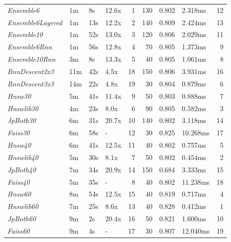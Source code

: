 \begin{tabular}{llllrrrlr}
\toprule
\midrule
\emph{Ensemble6} & 1m & 8s & 12.6x & 1 & 130 & 0.802 & 2.318ms & 12 \\
\emph{Ensemble6Layered} & 1m & 13s & 12.2x & 2 & 140 & 0.809 & 2.424ms & 13 \\
\emph{Ensemble10} & 1m & 52s & 13.0x & 3 & 120 & 0.806 & 2.029ms & 11 \\
\emph{Ensemble6Rnn} & 1m & 56s & 12.8x & 4 & 70 & 0.805 & 1.373ms & 9 \\
\emph{Ensemble10Rnn} & 3m & 8s & 13.3x & 5 & 40 & 0.805 & 1.061ms & 8 \\
\emph{RnnDescent2x3} & 11m & 42s & 4.5x & 18 & 150 & 0.806 & 3.931ms & 16 \\
\emph{RnnDescent3x3} & 14m & 22s & 4.8x & 19 & 30 & 0.804 & 0.879ms & 6 \\
\emph{Hnsw30} & 5m & 41s & 11.4x & 9 & 50 & 0.803 & 0.888ms & 7 \\
\emph{Hnswlib30} & 4m & 23s & 8.0x & 6 & 90 & 0.805 & 0.582ms & 3 \\
\emph{JpBoth30} & 6m & 31s & 20.7x & 10 & 140 & 0.802 & 3.118ms & 14 \\
\emph{Faiss30} & 6m & 58s & - & 12 & 30 & 0.825 & 10.268ms & 17 \\
\emph{Hnsw40} & 6m & 41s & 12.5x & 11 & 40 & 0.802 & 0.757ms & 5 \\
\emph{Hnswlib40} & 5m & 30s & 8.1x & 7 & 50 & 0.802 & 0.454ms & 2 \\
\emph{JpBoth40} & 7m & 34s & 20.9x & 14 & 150 & 0.684 & 3.333ms & 15 \\
\emph{Faiss40} & 5m & 35s & - & 8 & 40 & 0.802 & 11.238ms & 18 \\
\emph{Hnsw60} & 8m & 54s & 12.5x & 15 & 40 & 0.819 & 0.717ms & 4 \\
\emph{Hnswlib60} & 7m & 25s & 8.6x & 13 & 40 & 0.828 & 0.412ms & 1 \\
\emph{JpBoth60} & 9m & 2s & 20.4x & 16 & 50 & 0.821 & 1.600ms & 10 \\
\emph{Faiss60} & 9m & 4s & - & 17 & 30 & 0.807 & 12.040ms & 19 \\
\bottomrule
\end{tabular}
